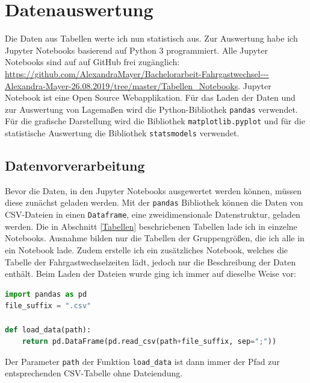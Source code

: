 \chapter{Datenauswertung} \label{Datenauswertung}
Die Daten aus Tabellen werte ich nun statistisch aus. Zur Auswertung habe ich \textsf{Jupyter Notebooks} basierend auf Python 3 programmiert. Alle \textsf{Jupyter Notebooks} sind auf auf GitHub frei zugänglich: \url{https://github.com/AlexandraMayer/Bachelorarbeit-Fahrgastwechsel---Alexandra-Mayer-26.08.2019/tree/master/Tabellen_Notebooks}. \textsf{Jupyter Notebook} ist eine Open Source Webapplikation. Für das Laden der Daten und zur Auswertung von Lagemaßen wird die Python-Bibliothek \texttt{pandas} verwendet. Für die grafische Darstellung wird die Bibliothek \texttt{matplotlib.pyplot} und für die statistische Auswertung die Bibliothek \texttt{statsmodels} verwendet.

\section{Datenvorverarbeitung}  \label{Datenvorverarbeitung}
Bevor die Daten, in den \textsf{Jupyter Notebooks} ausgewertet werden können, müssen diese zunächst geladen werden. Mit der \texttt{pandas} Bibliothek können die Daten von CSV-Dateien in einen \texttt{Dataframe}, eine zweidimensionale Datenstruktur, geladen werden. Die in Abschnitt \ref{Tabellen} beschriebenen Tabellen lade ich in einzelne \textsf{Notebooks}. Ausnahme bilden nur die Tabellen der Gruppengrößen, die ich alle in ein \textsf{Notebook} lade. Zudem erstelle ich ein zusätzliches \textsf{Notebook}, welches die Tabelle der Fahrgastwechselzeiten lädt, jedoch nur die Beschreibung der Daten enthält. Beim Laden der Dateien wurde ging ich immer auf dieselbe Weise vor:

\begin{lstlisting}[language=Python]
import pandas as pd
file_suffix = ".csv"
 
def load_data(path):
    return pd.DataFrame(pd.read_csv(path+file_suffix, sep=";"))

\end{lstlisting}
Der Parameter \texttt{path} der Funktion \texttt{load\_data} ist dann immer der Pfad zur entsprechenden CSV-Tabelle ohne Dateiendung.

